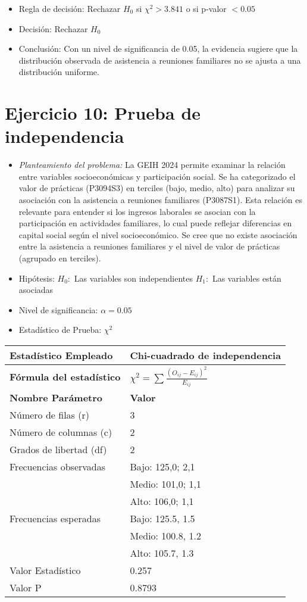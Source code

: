 \documentclass[12pt,a4paper]{article}
\begin{document}
\begin{itemize}
    \item Regla de decisión: Rechazar $H_0$ si $\chi^2 > 3.841$ o si p-valor $< 0.05$
    \item Decisión: Rechazar $H_0$
    \item Conclusión: Con un nivel de significancia de 0.05, la evidencia sugiere que la distribución observada de asistencia a reuniones familiares no se ajusta a una distribución uniforme.
\end{itemize}

\section*{Ejercicio 10: Prueba de independencia}
\begin{itemize}
    \item \textit{Planteamiento del problema:} La GEIH 2024 permite examinar la relación entre variables socioeconómicas y participación social. Se ha categorizado el valor de prácticas (P3094S3) en terciles (bajo, medio, alto) para analizar su asociación con la asistencia a reuniones familiares (P3087S1). Esta relación es relevante para entender si los ingresos laborales se asocian con la participación en actividades familiares, lo cual puede reflejar diferencias en capital social según el nivel socioeconómico. Se cree que no existe asociación entre la asistencia a reuniones familiares y el nivel de valor de prácticas (agrupado en terciles).
    \item Hipótesis: \quad $H_{0}:$ Las variables son independientes \hspace{2cm} $H_{1}:$ Las variables están asociadas
    \item Nivel de significancia: $\alpha = 0.05$
    \item Estadístico de Prueba: $\chi^2$
\end{itemize}

\begin{tabular}{|m{7cm}|m{7cm}|}
\hline
\textbf{Estadístico Empleado} & Chi-cuadrado de independencia \\ \hline
\textbf{Fórmula del estadístico} & $\chi^2 = \sum \frac{(O_{ij} - E_{ij})^2}{E_{ij}}$ \\ \hline
\textbf{Nombre Parámetro} & \textbf{Valor} \\ \hline
Número de filas (r) & 3 \\ \hline
Número de columnas (c) & 2 \\ \hline
Grados de libertad (df) & 2 \\ \hline
Frecuencias observadas & Bajo: 125,0; 2,1 \\ \hline
& Medio: 101,0; 1,1 \\ \hline
& Alto: 106,0; 1,1 \\ \hline
Frecuencias esperadas & Bajo: 125.5, 1.5 \\ \hline
& Medio: 100.8, 1.2 \\ \hline
& Alto: 105.7, 1.3 \\ \hline
Valor Estadístico & 0.257 \\ \hline
Valor P & 0.8793 \\ \hline
\end{tabular}
\end{document}
